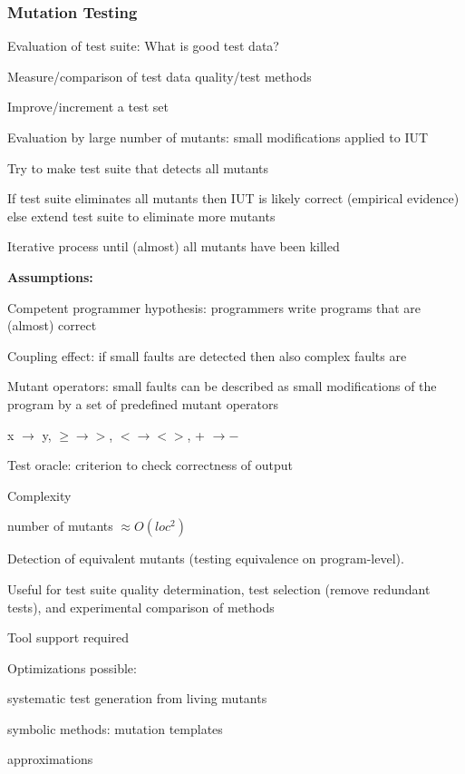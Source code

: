 \subsubsection{Mutation Testing}
\begin{itemize*}
\item Evaluation of test suite: What is good test data?
\item Measure/comparison of test data quality/test methods
\item Improve/increment a test set
\item Evaluation by large number of mutants: small modifications applied to IUT
\item Try to make test suite that detects all mutants
\item If test suite eliminates all mutants then IUT is likely correct (empirical evidence) else extend test suite to eliminate more mutants
\item Iterative process until (almost) all mutants have been killed
\end{itemize*}


\textbf{Assumptions:}
\begin{itemize*}
\item Competent programmer hypothesis: programmers write programs that are (almost) correct
\item Coupling effect: if small faults are detected then also complex faults are
\item Mutant operators: small faults can be described as small modifications of the program by a set of predefined mutant operators
\begin{itemize*}
\item x $\rightarrow$ y,  $\geq \rightarrow > $, $ < \rightarrow <>$, + $\rightarrow -$ 
\end{itemize*}
\item Test oracle: criterion to check correctness of output
\item Complexity
	\begin{itemize*}
		\item  number of mutants $\approx O(loc^2)$
	\end{itemize*}
\item Detection of equivalent mutants (testing equivalence on program-level).
\item Useful for test suite quality determination, test selection (remove redundant tests), and experimental comparison of methods
\item Tool support required
\item Optimizations possible:
\begin{itemize*}
\item systematic test generation from living mutants
\item symbolic methods: mutation templates
\item approximations
\end{itemize*}
\end{itemize*}
